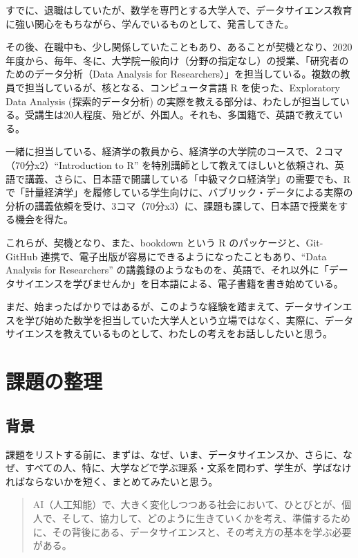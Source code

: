 \documentclass[
]{book}
\theoremstyle{definition}
\theoremstyle{definition}
\theoremstyle{definition}
\theoremstyle{definition}
\theoremstyle{remark}
\begin{document}
すでに、退職はしていたが、数学を専門とする大学人で、データサイエンス教育に強い関心をもちながら、学んでいるものとして、発言してきた。

その後、在職中も、少し関係していたこともあり、あることが契機となり、2020年度から、毎年、冬に、大学院一般向け（分野の指定なし）の授業、「研究者のためのデータ分析（Data Analysis for Researchers）」を担当している。複数の教員で担当しているが、核となる、コンピュータ言語 R を使った、Exploratory Data Analysis (探索的データ分析) の実際を教える部分は、わたしが担当している。受講生は20人程度、殆どが、外国人。それも、多国籍で、英語で教えている。

一緒に担当している、経済学の教員から、経済学の大学院のコースで、２コマ（70分x2）``Introduction to R'' を特別講師として教えてほしいと依頼され、英語で講義、さらに、日本語で開講している「中級マクロ経済学」の需要でも、R で「計量経済学」を履修している学生向けに、バブリック・データによる実際の分析の講義依頼を受け、3コマ（70分x3）に、課題も課して、日本語で授業をする機会を得た。

これらが、契機となり、また、bookdown という R のパッケージと、Git-GitHub 連携で、電子出版が容易にできるようになったこともあり、``Data Analysis for Researchers'' の講義録のようなものを、英語で、それ以外に「データサイエンスを学びませんか」を日本語による、電子書籍を書き始めている。

まだ、始まったばかりではあるが、このような経験を踏まえて、データサインエスを学び始めた数学を担当していた大学人という立場ではなく、実際に、データサイエンスを教えているものとして、わたしの考えをお話ししたいと思う。

\hypertarget{ux8ab2ux984cux306eux6574ux7406}{%
\section{課題の整理}\label{ux8ab2ux984cux306eux6574ux7406}}

\hypertarget{ux80ccux666f}{%
\subsection{背景}\label{ux80ccux666f}}

課題をリストする前に、まずは、なぜ、いま、データサイエンスか、さらに、なぜ、すべての人、特に、大学などで学ぶ理系・文系を問わず、学生が、学ばなければならないかを短く、まとめてみたいと思う。

\begin{quote}
AI（人工知能）で、大きく変化しつつある社会において、ひとびとが、個人で、そして、協力して、どのように生きていくかを考え、準備するために、その背後にある、データサイエンスと、その考え方の基本を学ぶ必要がある。
\end{quote}
\end{document}
